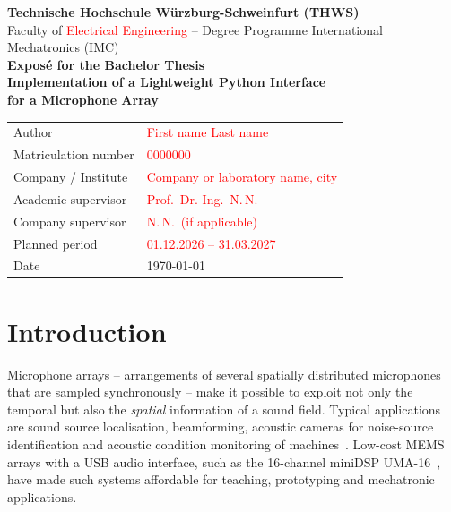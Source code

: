 \documentclass[11pt,a4paper]{article}
\newcommand{\ph}[1]{\textcolor{red}{#1}}
\begin{document}
\begin{center}
  {\large\bfseries Technische Hochschule Würzburg-Schweinfurt (THWS)}\\[0.2em]
  Faculty of \ph{Electrical Engineering} -- Degree Programme International Mechatronics (IMC)\\[1.2em]
  {\Large\bfseries Exposé for the Bachelor Thesis}\\[1.0em]
  {\LARGE\bfseries Implementation of a Lightweight Python Interface\\[0.3em]
   for a Microphone Array}\\[1.2em]
  \begin{tabular}{@{}ll@{}}
    \toprule
    Author               & \ph{First name Last name} \\
    Matriculation number & \ph{0000000} \\
    Company / Institute  & \ph{Company or laboratory name, city} \\
    Academic supervisor  & \ph{Prof.\ Dr.-Ing.\ N.\,N.} \\
    Company supervisor   & \ph{N.\,N.\ (if applicable)} \\
    Planned period       & \ph{01.12.2026 -- 31.03.2027} \\
    Date                 & \today \\
    \bottomrule
  \end{tabular}
\end{center}

\section{Introduction}
Microphone arrays -- arrangements of several spatially distributed microphones
that are sampled synchronously -- make it possible to exploit not only the
temporal but also the \emph{spatial} information of a sound field. Typical
applications are sound source localisation, beamforming, acoustic cameras for
noise-source identification and acoustic condition monitoring of
machines~\cite{benesty2008,brandstein2001}. Low-cost MEMS arrays with a USB
audio interface, such as the 16-channel miniDSP UMA-16~\cite{minidsp_uma16},
have made such systems affordable for teaching, prototyping and mechatronic
applications.
\end{document}
